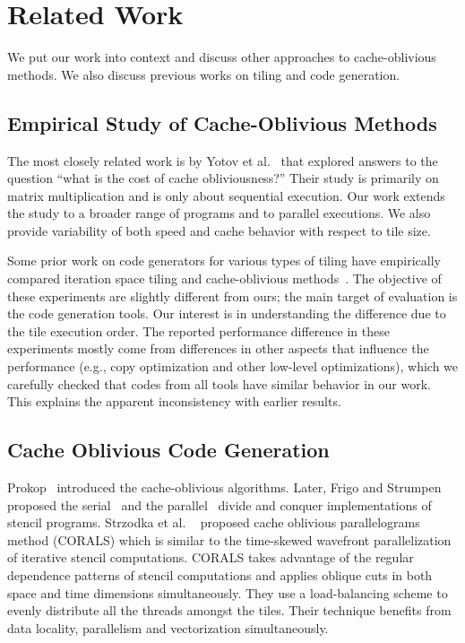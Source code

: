 \section{Related Work}
\label{sec:related}

We put our work into context and discuss other approaches to cache-oblivious methods. We also discuss previous works on tiling and code generation. 

\subsection{Empirical Study of Cache-Oblivious Methods}
The most closely related work is by Yotov et al.~\cite{yotov2007experimental} that explored answers to the question ``what is the cost of cache obliviousness?'' Their study is primarily on matrix multiplication and is only about sequential execution.  Our work extends the study to a broader range of programs and to parallel executions. We also provide variability of both speed and cache behavior with respect to tile size.

Some prior work on code generators for various types of tiling have empirically compared iteration space tiling and cache-oblivious methods~\cite{Bandishti12, lifflander2017cache, autogen-ppopp16, strzodka2010cache, zou2015rajopadhye}. The objective of these experiments are slightly different from ours; the main target of evaluation is the code generation tools. Our interest is in understanding the difference due to the tile execution order. The reported performance difference in these experiments mostly come from differences in other aspects that influence the performance (e.g., copy optimization and other low-level optimizations), which we carefully checked that codes from all tools have similar behavior in our work. This explains the apparent inconsistency with earlier results.

\subsection{Cache Oblivious Code Generation}
Prokop~\cite{prokop-thesis99, frigo-etal-focs99} introduced the cache-oblivious algorithms. Later, Frigo and Strumpen proposed the serial~\cite{frigo-strumpen-ics05} and the parallel~\cite{frigo2006cache} divide and conquer implementations of stencil programs.  Strzodka et al. ~\cite{strzodka2010cache} proposed cache oblivious parallelograms method (CORALS) which is similar to the time-skewed wavefront parallelization of iterative stencil computations. CORALS takes advantage of the regular dependence patterns of stencil computations and applies oblique cuts in both space and time dimensions simultaneously. They use a load-balancing scheme to evenly distribute all the threads amongst the tiles.  Their technique benefits from data locality, parallelism and vectorization simultaneously.  

